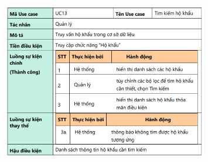 \documentclass{article}
\begin{document}
\begin{itemize}
    \begin{figure}[H]
        \centering
        \includegraphics[width=0.8\textwidth]{Ảnh chương 2/UC13.png}
    \end{figure}


\end{itemize}
\end{document}
